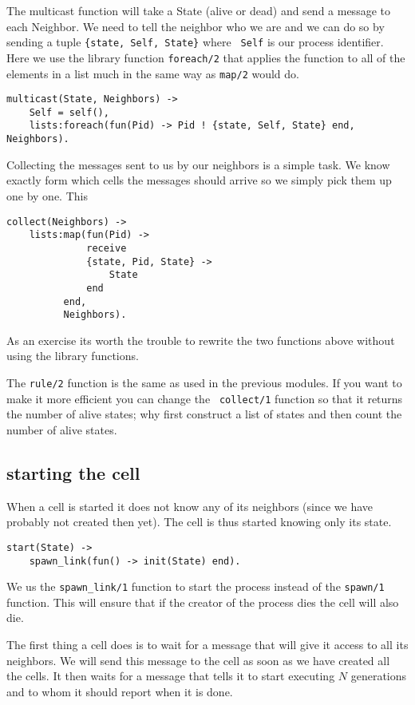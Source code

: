\documentclass[a4paper,11pt]{article}
\begin{document}
The multicast function will take a State (alive or dead) and send a
message to each Neighbor. We need to tell the neighbor who we are and
we can do so by sending a tuple {\tt\{state, Self, State\}} where {\tt
  Self} is our process identifier. Here we use the library function
{\tt foreach/2} that applies the function to all of the elements in a
list much in the same way as {\tt map/2} would do.

\begin{verbatim}
multicast(State, Neighbors) ->
    Self = self(),
    lists:foreach(fun(Pid) -> Pid ! {state, Self, State} end, Neighbors).
\end{verbatim}


Collecting the messages sent to us by our neighbors is a simple
task. We know exactly form which cells the messages should arrive so
we simply pick them up one by one. This 

\begin{verbatim}
collect(Neighbors) ->
    lists:map(fun(Pid) ->
		      receive
			  {state, Pid, State} ->
			      State
		      end
	      end,
	      Neighbors).
\end{verbatim}

As an exercise its worth the trouble to rewrite the two functions
above without using the library functions. 

The {\tt rule/2} function is the same as used in the previous
modules. If you want to make it more efficient you can change the {\tt
  collect/1} function so that it returns the number of alive states;
why first construct a list of states and then count the number of
alive states.

\subsection{starting the cell}

When a cell is started it does not know any of its neighbors (since we
have probably not created then yet). The cell is thus started knowing
only its state.

\begin{verbatim}
start(State) ->
    spawn_link(fun() -> init(State) end).
\end{verbatim}

We us the {\tt spawn\_link/1} function to start the process instead of
the {\tt spawn/1} function. This will ensure that if the creator of
the process dies the cell will also die.

The first thing a cell does is to wait for a message that will give it
access to all its neighbors. We will send this message to the cell as
soon as we have created all the cells. It then waits for a message
that tells it to start executing $N$ generations and to whom it should
report when it is done.
\end{document}
